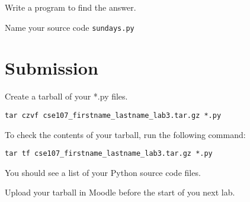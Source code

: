 \documentclass[12pt]{article}
\begin{document}
\begin{enumerate}
Write a program to find the answer.

Name your source code \texttt{sundays.py}

%
%
%


\end{enumerate}








\section*{Submission}

Create a tarball of your *.py files.

\begin{lstlisting}[style=bash]
tar czvf cse107_firstname_lastname_lab3.tar.gz *.py
\end{lstlisting}


To check the contents of your tarball, run the following command:

\begin{lstlisting}[style=bash]
tar tf cse107_firstname_lastname_lab3.tar.gz *.py
\end{lstlisting}

You should see a list of your Python source code files.

Upload your tarball in Moodle before the start of you next lab.
\end{document}
